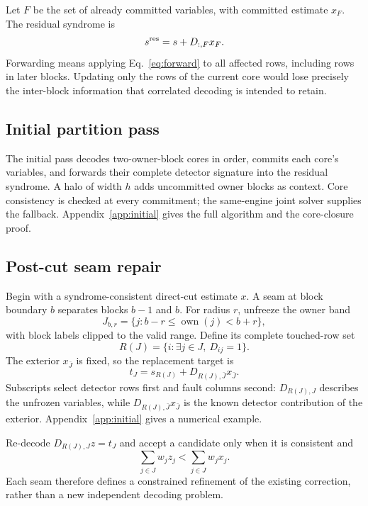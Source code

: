 \documentclass[10pt,letterpaper,twocolumn]{article}
\newcommand{\own}{\operatorname{own}}
\begin{document}
Let $F$ be the set of already committed variables, with committed estimate $x_F$. The residual syndrome is
\begin{equation}s^{\rm res}=s+D_{:,F}x_F.\label{eq:forward}\end{equation}
Forwarding means applying Eq.~\eqref{eq:forward} to all affected rows, including rows in later blocks. Updating only the rows of the current core would lose precisely the inter-block information that correlated decoding is intended to retain.

\subsection{Initial partition pass}
The initial pass decodes two-owner-block cores in order, commits each core's variables, and forwards their complete detector signature into the residual syndrome. A halo of width $h$ adds uncommitted owner blocks as context. Core consistency is checked at every commitment; the same-engine joint solver supplies the fallback. Appendix~\ref{app:initial} gives the full algorithm and the core-closure proof.

\subsection{Post-cut seam repair}
Begin with a syndrome-consistent direct-cut estimate $x$. A seam at block boundary $b$ separates blocks $b-1$ and $b$. For radius $r$, unfreeze the owner band
\begin{equation}J_{b,r}=\{j:b-r\le\own(j)<b+r\},\label{eq:band}\end{equation}
with block labels clipped to the valid range. Define its complete touched-row set
\begin{equation}R(J)=\{i:\exists j\in J,\ D_{ij}=1\}.\label{eq:rows}\end{equation}
The exterior $x_{\bar J}$ is fixed, so the replacement target is
\begin{equation}t_J=s_{R(J)}+D_{R(J),\bar J}x_{\bar J}.\label{eq:target}\end{equation}
Subscripts select detector rows first and fault columns second: $D_{R(J),J}$ describes the unfrozen variables, while $D_{R(J),\bar J}x_{\bar J}$ is the known detector contribution of the exterior. Appendix~\ref{app:initial} gives a numerical example.

Re-decode $D_{R(J),J}z=t_J$ and accept a candidate only when it is consistent and
\begin{equation}\sum_{j\in J}w_jz_j<\sum_{j\in J}w_jx_j.\label{eq:accept}\end{equation}
Each seam therefore defines a constrained refinement of the existing correction, rather than a new independent decoding problem.
\end{document}
